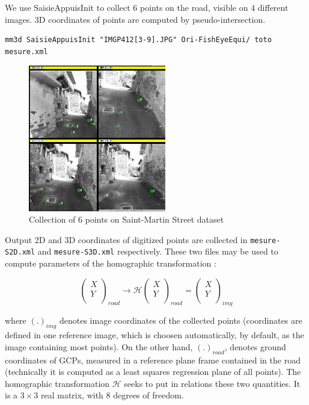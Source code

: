 \noindent We use SaisieAppuisInit to collect 6 points on the road, visible on 4 different images. 3D coordinates of points are computed by pseudo-intersection. \newline

\begin{verbatim}
mm3d SaisieAppuisInit "IMGP412[3-9].JPG" Ori-FishEyeEqui/ toto mesure.xml
\end{verbatim}

\begin{figure}[!h]
	\begin{center}
		\includegraphics[width=60mm]{FIGS/StreetSainMartin/saisieAppuisHomol.jpg}
		\caption{Collection of 6 points on Saint-Martin Street dataset}
	\end{center}	
\end{figure}

\noindent Output 2D and 3D coordinates of digitized points are collected in \texttt{mesure-S2D.xml} and \texttt{mesure-S3D.xml} respectively. These two files may be used to compute parameters of the homographic transformation :
\newline

$$\left(
\begin{array}{c}
X\\
Y\\
\end{array}
\right)_{road} \rightarrow \mathcal{H}\left(\begin{array}{c}
X\\
Y\\
\end{array}\right)_{road} = \left(\begin{array}{c}
X\\
Y\\
\end{array}\right)_{img}$$ \newline

\noindent where $(.)_{img}$ denotes image coordinates of the collected points (coordinates are defined in one reference image, which is choosen automatically, by default, as the image containing most points). On the other hand, $(.)_{road}$, denotes ground coordinates of GCPs, measured in a reference plane frame contained in the road (technically it is computed as a least squares regression plane of all points). The homographic transformation $\mathcal{H}$ seeks to put in relations these two quantities. It is a $3 \times 3$ real matrix, with 8 degrees of freedom. \newline

